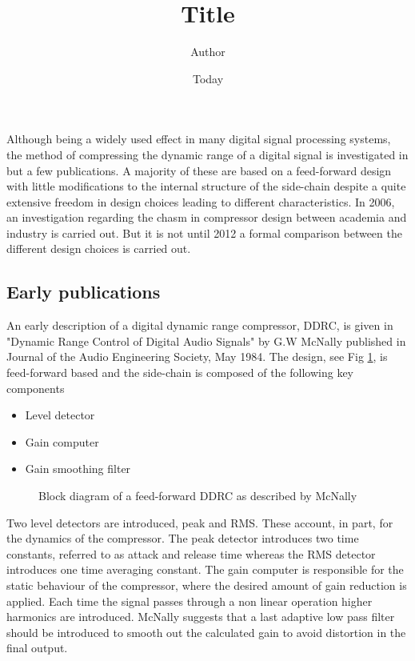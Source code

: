 \documentclass[]{article}
\begin{document}
\title{Title}
\author{Author}
\date{Today}
\maketitle
\section*{}
Although being a widely used effect in many digital signal processing systems, the method of compressing the dynamic range of a digital signal is investigated in but a few publications. A majority of these are based on a feed-forward design with little modifications to the internal structure of the side-chain despite a quite extensive freedom in design choices leading to different characteristics.  In 2006, an investigation regarding the chasm in compressor design between academia and industry is carried out. But it is not until 2012 a formal comparison between the different design choices is carried out.

\subsection*{Early publications}
An early description of a digital dynamic range compressor, DDRC, is given in "Dynamic Range Control of Digital Audio Signals" by G.W McNally published in Journal of the Audio Engineering Society, May 1984. The design, see Fig \ref{fig:mcnaBlock}, is feed-forward based and the side-chain is composed of the following key components
\begin{itemize}
\item{Level detector}
\item{Gain computer}
\item{Gain smoothing filter}
\end{itemize}
\begin{figure}

\caption{Block diagram of a feed-forward DDRC as described by McNally}
\label{fig:mcnaBlock}
\end{figure}
Two level detectors are introduced, peak and RMS. These account, in part, for the dynamics of the compressor. The peak detector introduces two time constants, referred to as attack and release time whereas the RMS detector introduces one time averaging constant. The gain computer is responsible for the static behaviour of the compressor, where the desired amount of gain reduction is applied. Each time the signal passes through a non linear operation higher harmonics are introduced. McNally suggests that a last adaptive low pass filter should be introduced to smooth out the calculated gain to avoid distortion in the final output.
\end{document}
